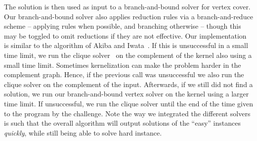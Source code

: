 \documentclass[a4paper,UKenglish]{lipics-v2016}
\begin{document}
The solution is then used as input to a branch-and-bound solver for vertex cover. Our branch-and-bound solver also applies reduction rules via a branch-and-reduce scheme -- applying rules when possible, and branching otherwise -- though this may be toggled to omit reductions if they are not effective.
Our implementation is similar to the algorithm of Akiba and Iwata~\cite{akiba-tcs-2016}. If this is unsuccessful in a small time limit, we run the clique solver~\cite{DBLP:journals/cor/LiJM17} on the complement of the kernel also using a small time limit. Sometimes kernelization can make the problem harder in the complement graph. Hence, if the previous call was unsuccessful we also run the clique solver on the complement of the input. Afterwards, if we still did not find a solution, we run our branch-and-bound vertex solver on the kernel using a larger time limit. If unsuccessful, we run the clique solver until the end of the time given to the program by the challenge. Note the way we integrated the different solvers is such that the overall algorithm will output solutions of the ``easy'' instances \emph{quickly}, while still being able to solve hard instance.



\end{document}
